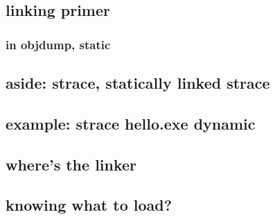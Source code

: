 \subsection{linking primer}


\subsubsection{in objdump, static}


\subsection{aside: strace, statically linked strace}



\subsection{example: strace hello.exe dynamic}



\subsection{where's the linker}



\subsection{knowing what to load?}



